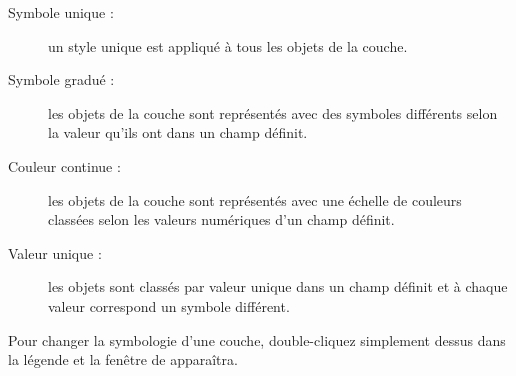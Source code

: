 \begin{description}
\item[Symbole unique :]  un style unique est appliqué à tous les objets de la couche.
\item[Symbole gradué :]  les objets de la couche sont représentés avec des symboles différents selon la valeur qu'ils ont dans un champ définit.
\item[Couleur continue :] les objets de la couche sont représentés avec une échelle de couleurs classées selon les valeurs numériques d'un champ définit.
\item[Valeur unique :]  les objets sont classés par valeur unique dans un champ définit et à chaque valeur correspond un symbole différent.
\end{description}

Pour changer la symbologie d'une couche, double-cliquez simplement dessus dans la légende et la fenêtre de  apparaîtra.

